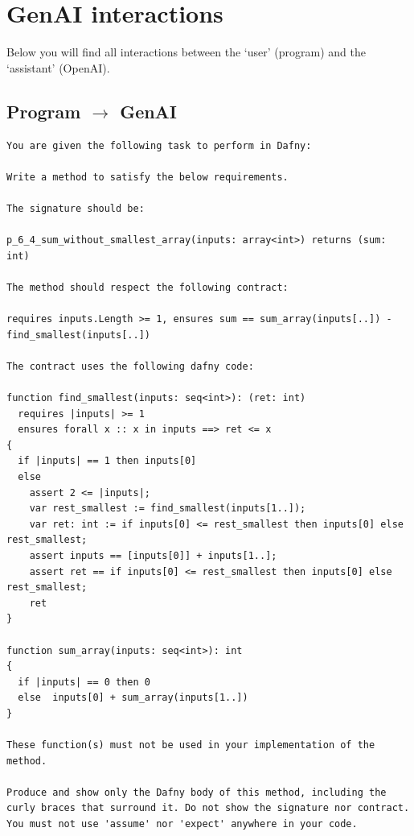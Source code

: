 \documentclass{article}
\begin{document}
\section*{GenAI interactions}
Below you will find all interactions between the `user' (program) and the `assistant' (OpenAI).
\subsection*{Program $\rightarrow$ GenAI}
\begin{lstlisting}
You are given the following task to perform in Dafny:

Write a method to satisfy the below requirements.

The signature should be:

p_6_4_sum_without_smallest_array(inputs: array<int>) returns (sum: int)

The method should respect the following contract:

requires inputs.Length >= 1, ensures sum == sum_array(inputs[..]) - find_smallest(inputs[..])

The contract uses the following dafny code:

function find_smallest(inputs: seq<int>): (ret: int)
  requires |inputs| >= 1
  ensures forall x :: x in inputs ==> ret <= x 
{
  if |inputs| == 1 then inputs[0]
  else 
    assert 2 <= |inputs|;
    var rest_smallest := find_smallest(inputs[1..]);
    var ret: int := if inputs[0] <= rest_smallest then inputs[0] else rest_smallest;
    assert inputs == [inputs[0]] + inputs[1..]; 
    assert ret == if inputs[0] <= rest_smallest then inputs[0] else rest_smallest;
    ret 
}

function sum_array(inputs: seq<int>): int
{
  if |inputs| == 0 then 0
  else  inputs[0] + sum_array(inputs[1..])
}

These function(s) must not be used in your implementation of the method.

Produce and show only the Dafny body of this method, including the curly braces that surround it. Do not show the signature nor contract. You must not use 'assume' nor 'expect' anywhere in your code.
\end{lstlisting}
\end{document}

